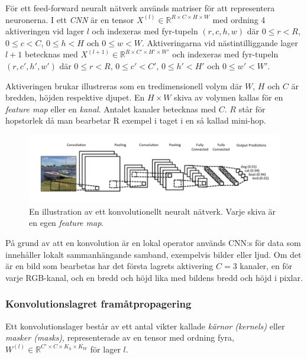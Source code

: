 \documentclass[a4paper,11pt,twoside]{article}
\begin{document}
För ett feed-forward neuralt nätverk används matriser för att representera neuronerna. I ett \textit{CNN} är en tensor $X^{(l)} \in \mathbb{R}^{R \times C  \times H \times W}$ med ordning 4 aktiveringen vid lager $l$ och indexeras med fyr-tupeln $(r,c,h,w)$ där $0 \leq r < R$, $0 \leq c < C$, $0 \leq h < H$ och $0 \leq w < W$. Aktiveringarna vid nästintilliggande lager $l+1$ betecknas med $X^{(l+1)} \in \mathbb{R}^{R \times C' \times H' \times W'}$ och indexeras med fyr-tupeln $(r,c',h',w')$ där $0 \leq r < R$, $0 \leq c' < C'$, $0 \leq h' < H'$ och $0 \leq w' < W'$. \cite{cs231n} \cite{convmath}








Aktiveringen brukar illustreras som en tredimensionell volym där $W$, $H$ och $C$ är bredden, höjden respektive djupet. En $H \times W$ skiva av volymen kallas för en \textit{feature map} eller en \textit{kanal}. Antalet kanaler betecknas med $C$. $R$ står för hopstorlek då man bearbetar R exempel i taget i en så kallad mini-hop. \cite{cs231n} \cite{convmath}

\begin{figure}[h]\label{figboatcnn}
	\centering
  		\includegraphics[scale=0.6]{boatcnn.png}
  	\caption{En illustration av ett konvolutionellt neuralt nätverk. Varje skiva är en egen \textit{feature map}. \cite{figboatcnn}}
\end{figure}

På grund av att en konvolution är en lokal operator används CNN:s för data som innehåller lokalt sammanhängande samband, exempelvis bilder eller ljud. Om det är en bild som bearbetas har det första lagrets aktivering $C = 3$ kanaler, en för varje RGB-kanal, och en bredd och höjd lika med bildens bredd och höjd i pixlar. \cite{cs231n} \cite{convmath}

\subsubsection{Konvolutionslagret framåtpropagering}
Ett konvolutionslager består av ett antal vikter kallade \textit{kärnor (kernels)} eller \textit{masker (masks)}, representerade av en tensor med ordning fyra, $W^{(l)} \in \mathbb{R}^{C' \times C  \times K_h \times K_W}$ för lager $l$. \cite{cs231n} \cite{convmath}
\end{document}
